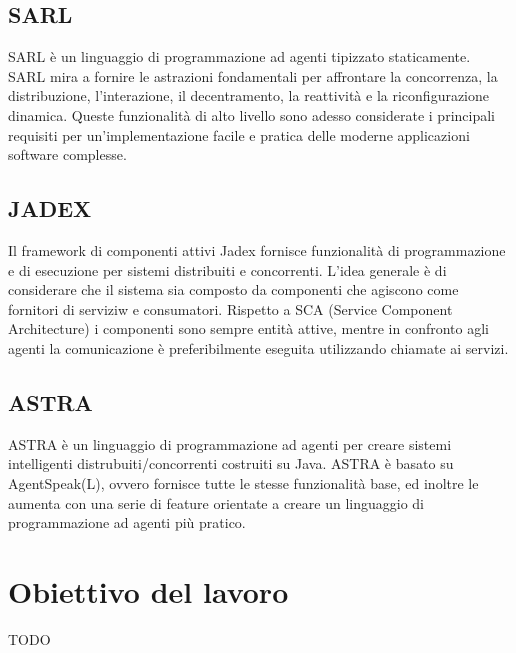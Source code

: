 \subsection{SARL}
SARL \`e un linguaggio di programmazione ad agenti tipizzato staticamente. SARL mira a fornire le astrazioni fondamentali per affrontare la concorrenza, la distribuzione, l'interazione, il decentramento, la reattivit\`a e la riconfigurazione dinamica. Queste funzionalit\`a di alto livello sono adesso considerate i principali requisiti per un'implementazione facile e pratica delle moderne applicazioni software complesse.

\subsection{JADEX}
Il framework di componenti attivi Jadex fornisce funzionalit\`a di programmazione e di esecuzione per sistemi distribuiti e concorrenti. L'idea generale \`e di considerare che il sistema sia composto da componenti che agiscono come fornitori di serviziw e consumatori.
Rispetto a SCA (Service Component Architecture) i componenti sono sempre entit\`a attive, mentre in confronto agli agenti la comunicazione \`e preferibilmente eseguita utilizzando chiamate ai servizi.

\subsection{ASTRA}
ASTRA \`e un linguaggio di programmazione ad agenti per creare sistemi intelligenti distrubuiti/concorrenti costruiti su Java.
ASTRA \`e basato su AgentSpeak(L), ovvero fornisce tutte le stesse funzionalit\`a base, ed inoltre le aumenta con una serie di feature orientate a creare un linguaggio di programmazione ad agenti pi\`u pratico.




\section{Obiettivo del lavoro}
TODO 


